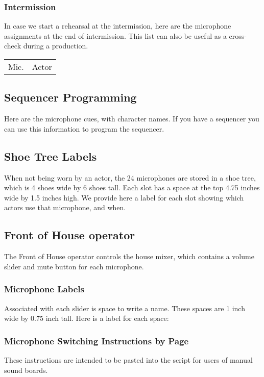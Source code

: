 \documentclass[letterpaper]{article}
\begin{document}
\subsubsection {Intermission}

In case we start a rehearsal at the intermission, here are the microphone
assignments at the end of intermission.  This list can also be useful as a 
cross-check during a production.

\begin{center}
\begin{longtable}{|l|l|}
\hline Mic. & Actor \endhead \hline

\end{longtable}
\end{center}

\subsection {Sequencer Programming}

Here are the microphone cues, with character names.  If you
have a sequencer you can use this information to program
the sequencer.



\subsection {Shoe Tree Labels}

When not being worn by an actor, the 24 microphones are stored in a shoe tree,
which is 4 shoes wide by 6 shoes tall.  
Each slot has a space at the top 4.75 inches wide
by 1.5 inches high.  We provide here a label for each slot showing which
actors use that microphone, and when.

{\Large

}

\subsection {Front of House operator}

The Front of House operator controls the house mixer, 
which contains a volume slider
and mute button for each microphone.  

\subsubsection {Microphone Labels}

Associated with each slider is space to write a name.  
These spaces are 1 inch wide by 0.75 inch tall.  
Here is a label for each space:

{\Large

}

\subsubsection {Microphone Switching Instructions by Page}

These instructions are intended to be pasted into the script for users
of manual sound boards.


\end{document}
